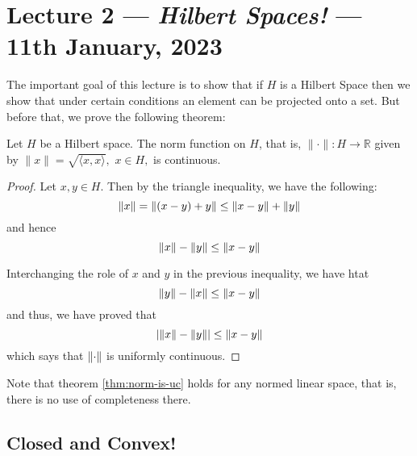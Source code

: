 \section{Lecture 2 --- \textit{Hilbert Spaces!} --- 11th January, 2023}
The important goal of this lecture is to show that if $H$ is a Hilbert Space then we show that under certain conditions an element can be projected onto a set. But before that, we prove the following theorem:

\begin{theorem}
Let $H$ be a Hilbert space. The norm function on $H$, that is,  $\|\cdot\| : H \to \mathbb R$ given by $\|x\|= \sqrt{\langle x,x\rangle},\,\,x\in H,$ is continuous.
    \label{thm:norm-is-uc}
\end{theorem}
\begin{proof}
    Let $x,y \in H$. Then by the triangle inequality, we have the following:
    \begin{equation*}
	\left\lVert x \right\rVert = \left\lVert \left( x-y \right) + y \right\rVert \le \left\lVert x-y \right\rVert + \left\lVert y \right\rVert
    \end{equation*}
    and hence
    \begin{equation*}
	\left\lVert x \right\rVert - \left\lVert y \right\rVert \le \left\lVert x-y \right\rVert
    \end{equation*}

    Interchanging the role of $x$ and $y$ in the previous inequality, we have htat 
    \begin{equation*}
	\left\lVert y \right\rVert - \left\lVert x \right\rVert \le \left\lVert x-y \right\rVert
    \end{equation*}
    and thus, we have proved that
    \begin{equation*}
	\left\lvert \left\lVert x \right\rVert - \left\lVert y \right\rVert \right\rvert \le \left\lVert x-y \right\rVert
    \end{equation*}
    which says that $\left\lVert \cdot \right\rVert$ is uniformly continuous.
\end{proof}

Note that theorem \ref{thm:norm-is-uc} holds for any normed linear space, that is, there is no use of completeness there.

\subsection{Closed and Convex!}

